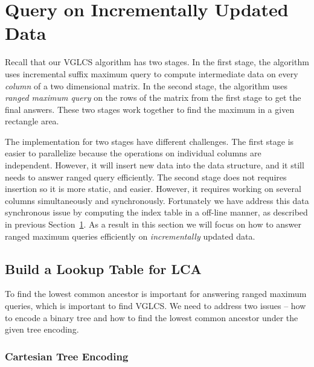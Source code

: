 \section{Query on Incrementally Updated Data} \label{sec:parallelIRMQ}

Recall that our VGLCS algorithm has two stages.  In the first stage,
the algorithm uses incremental suffix maximum query to compute
intermediate data on every {\em column} of a two dimensional matrix.
In the second stage, the algorithm uses {\em ranged maximum query} on
the rows of the matrix from the first stage to get the final answers.
These two stages work together to find the maximum in a given
rectangle area.

The implementation for two stages have different challenges.  The
first stage is easier to parallelize because the operations on
individual columns are independent.  However, it will insert new data
into the data structure, and it still needs to answer ranged query
efficiently. The second stage does not requires insertion so it is
more static, and easier.  However, it requires working on several
columns simultaneously and synchronously.  Fortunately we have address
this data synchronous issue by computing the index table in a off-line
manner, as described in previous Section~\ref{sec:parallelIRMQ}.  As a
result in this section we will focus on how to answer ranged maximum
queries efficiently on {\em incrementally} updated data.

%

\subsection{Build a Lookup Table for LCA}


To find the lowest common ancestor is important for answering ranged
maximum queries, which is important to find VGLCS.  We need to address
two issues -- how to encode a binary tree and how to find the lowest
common ancestor under the given tree encoding.


\subsubsection{Cartesian Tree Encoding}

